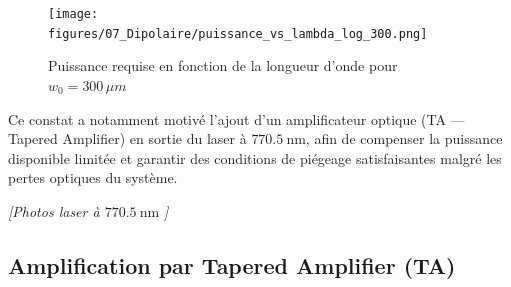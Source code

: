 \begin{figure}[H]
    \centering
    \texttt{[image: figures/07\_Dipolaire/puissance\_vs\_lambda\_log\_300.png]}
    \caption{Puissance requise en fonction de la longueur d'onde pour $w_0 = 300 \, \mu m$ }
\end{figure}

\medskip

Ce constat a notamment motivé l’ajout d’un amplificateur optique (TA — Tapered Amplifier) en sortie du laser à $770.5~\text{nm}$, afin de compenser la puissance disponible limitée et garantir des conditions de piégeage satisfaisantes malgré les pertes optiques du système.

\begin{center}
\textit{[Photos laser à $770.5~\text{nm}$ ]}
\end{center}


\subsection{Amplification par Tapered Amplifier (TA)}

